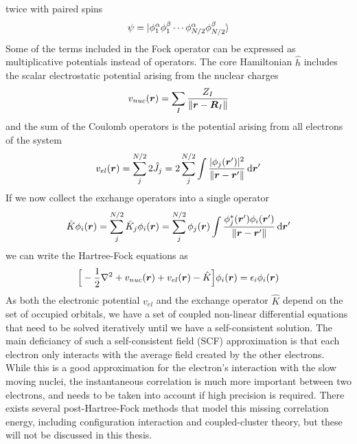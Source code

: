 twice with paired spins
\begin{equation}
    \psi = |\phi_1^\alpha\phi_1^\beta\cdots\phi_{N/2}^\alpha\phi_{N/2}^\beta\rangle
\end{equation}
Some of the terms included in the Fock operator can be expressed as multiplicative
potentials instead of operators. The core Hamiltonian $\hat{h}$ includes the scalar 
electrostatic potential arising from the nuclear charges
\begin{equation}
    v_{nuc}(\boldsymbol r) = \sum_{I} \frac{Z_I}{\|\boldsymbol r - \boldsymbol R_I\|}
\end{equation}
and the sum of the Coulomb operators is the potential arising from all electrons of the system
\begin{equation}
    v_{el}(\boldsymbol r) = \sum_j^{N/2} 2\hat{J}_j = 2 \sum_j^{N/2} \int \frac{|\phi_j(\boldsymbol r')|^2}
	{\|\boldsymbol r - \boldsymbol r'\|} \,\mathrm{d} \boldsymbol r'
\end{equation}
If we now collect the exchange operators into a single operator
\begin{equation}
    \label{eq:HF_exchange}
    \hat{K}\phi_i(\boldsymbol r) = \sum_j^{N/2} \hat{K}_j \phi_i(\boldsymbol r) 
	= \sum_j^{N/2} \phi_j (\boldsymbol r) \int \frac{\phi_j^{\ast}(\boldsymbol r')\phi_i(\boldsymbol r')}
	    {\|\boldsymbol r - \boldsymbol r'\|} \,\mathrm{d} \boldsymbol r'
\end{equation}
we can write the Hartree-Fock equations as
\begin{equation}
    \label{eq:HF_equations}
    \Big[-\frac{1}{2}\nabla^2 + v_{nuc}(\boldsymbol r) + v_{el}(\boldsymbol r) - \hat{K}\Big]\phi_i(\boldsymbol r) 
	= \epsilon_i \phi_i(\boldsymbol r)
\end{equation}
As both the electronic potential $v_{el}$ and the exchange operator $\hat{K}$ depend on the set of
occupied orbitals, we have a set of coupled non-linear differential equations that need to
be solved iteratively until we have a self-consistent solution. The main deficiancy of such
a self-consistent field (SCF) approximation is that each electron only interacts with the average field
created by the other electrons. While this is a good approximation for the electron's interaction
with the slow moving nuclei, the instantaneous correlation is much more important between two electrons,
and needs to be taken into account if high precision is required. There exists several post-Hartree-Fock
methods that model this missing correlation energy, including configuration interaction and coupled-cluster
theory, but these will not be discussed in this thesis.

